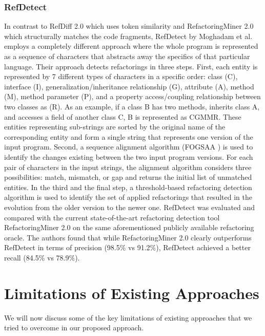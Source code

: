 \documentclass[letterpaper,12pt,onecolumn,final]{report}
\begin{document}
\subsubsection{RefDetect}
In contrast to RefDiff 2.0 \cite{Silva2020} which uses token similarity and RefactoringMiner 2.0 \cite{Tsantalis2020} which structurally matches the code fragments, RefDetect by Moghadam et al. \cite{Moghadam2021} employs a completely different approach where the whole program is represented as a sequence of characters that abstracts away the specifics of that particular language. Their approach detects refactorings in three steps. First, each entity is represented by 7 different types of characters in a specific order: class (C), interface (I), generalization/inheritance relationship (G), attribute (A), method (M), method parameter (P), and a property access/coupling relationship between two classes as (R). As an example, if a class B has two methods, inherits class A, and accesses a field of another class C, B is represented as CGMMR. These entities representing sub-strings are sorted by the original name of the corresponding entity and form a single string that represents one version of the input program. Second, a sequence alignment algorithm (FOGSAA \cite{chakraborty2013fogsaa}) is used to identify the changes existing between the two input program versions. For each pair of characters in the input strings, the alignment algorithm considers three possibilities: match, mismatch, or gap and returns the initial list of unmatched entities. In the third and the final step, a threshold-based refactoring detection algorithm is used to identify the set of applied refactorings that resulted in the evolution from the older version to the newer one. RefDetect was evaluated and compared with the current state-of-the-art refactoring detection tool RefactoringMiner 2.0 on the same aforementioned publicly available refactoring oracle. The authors found that while RefactoringMiner 2.0 clearly outperforms RefDetect in terms of precision (98.5\% vs 91.2\%), RefDetect achieved a better recall (84.5\% vs 78.9\%).

\section{Limitations of Existing Approaches}

We will now discuss some of the key limitations of existing approaches that we tried to overcome in our proposed approach.
\end{document}
